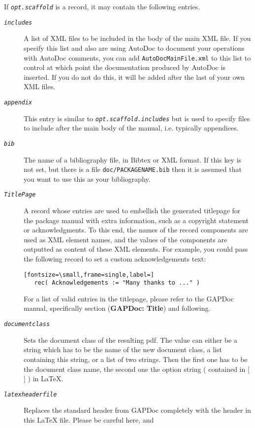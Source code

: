 \documentclass[a4paper,11pt]{report}
\begin{document}
{{{\begin{description}
\begin{description}
 If \mbox{\texttt{\mdseries\slshape opt.scaffold}} is a record, it may contain the following entries. 
\begin{description}
\item[{\mbox{\texttt{\mdseries\slshape includes}}}]  A list of XML files to be included in the body of the main XML file. If you
specify this list and also are using \textsf{AutoDoc} to document your operations with \textsf{AutoDoc} comments, you can add \texttt{AutoDocMainFile.xml} to this list to control at which point the documentation produced by \textsf{AutoDoc} is inserted. If you do not do this, it will be added after the last of your
own XML files. 
\item[{\mbox{\texttt{\mdseries\slshape appendix}}}]  This entry is similar to \mbox{\texttt{\mdseries\slshape opt.scaffold.includes}} but is used to specify files to include after the main body of the manual,
i.e. typically appendices. 
\item[{\mbox{\texttt{\mdseries\slshape bib}}}]  The name of a bibliography file, in Bibtex or XML format. If this key is not
set, but there is a file \texttt{doc/PACKAGENAME.bib} then it is assumed that you want to use this as your bibliography. 
\item[{\mbox{\texttt{\mdseries\slshape TitlePage}}}]  A record whose entries are used to embellish the generated titlepage for the
package manual with extra information, such as a copyright statement or
acknowledgments. To this end, the names of the record components are used as
XML element names, and the values of the components are outputted as content
of these XML elements. For example, you could pass the following record to set
a custom acknowledgements text: 
\begin{Verbatim}[fontsize=\small,frame=single,label=]
   rec( Acknowledgements := "Many thanks to ..." )
\end{Verbatim}
 For a list of valid entries in the titlepage, please refer to the \textsf{GAPDoc} manual, specifically section  (\textbf{GAPDoc: Title}) and following. 
\item[{\mbox{\texttt{\mdseries\slshape document{\textunderscore}class}}}]  Sets the document class of the resulting pdf. The value can either be a string
which has to be the name of the new document class, a list containing this
string, or a list of two strings. Then the first one has to be the document
class name, the second one the option string ( contained in [ ] ) in LaTeX. 
\item[{\mbox{\texttt{\mdseries\slshape latex{\textunderscore}header{\textunderscore}file}}}]  Replaces the standard header from \textsf{GAPDoc} completely with the header in this LaTeX file. Please be careful here, and

\end{description}
\end{description}
\end{description}}}}
\end{document}
